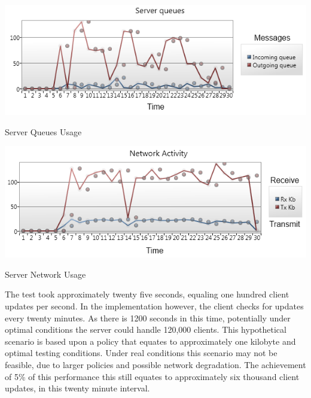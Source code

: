 		\vspace{6mm}
		\noindent\begin{minipage}{\textwidth}
			
			\begin{figurehere}
				\centering
				\includegraphics[scale=0.9]{pages/chapter3/figures/server-queues.png}
				\vspace{-2mm}
				\caption{Server Queues Usage}
				\label{fig:ServerQueueUsage}
			\end{figurehere}	
		
		\end{minipage}
		
		\vspace{6mm}
		\noindent\begin{minipage}{\textwidth}
			
			\begin{figurehere}
				\centering
				\includegraphics[scale=0.9]{pages/chapter3/figures/server-network.png}
				\vspace{-2mm}
				\caption{Server Network Usage}
				\label{fig:ServerNetworkUsage}
			\end{figurehere}	
		
		\end{minipage}
			
		\vspace{5mm}
		\normalsize
		{					
			The test took approximately twenty five seconds, equaling one hundred client updates per second.  In the implementation however,
			the client checks for updates every twenty minutes.  As there is 1200 seconds in this time, potentially under 
			optimal conditions the server could handle 120,000 clients.  This hypothetical scenario is based upon a policy
			that equates to approximately one kilobyte and optimal testing conditions.  
			Under real conditions this scenario may not be feasible, due to larger policies and possible network degradation. 
			The achievement of 5\% of this performance this still equates to approximately six thousand client updates, in this twenty minute interval.		
			\newline
		}	
			
